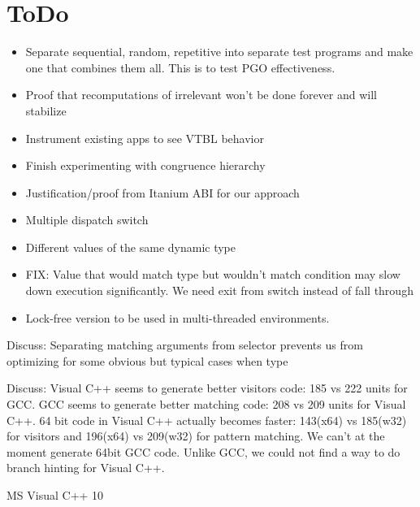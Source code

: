 \documentclass[submission,copyright]{eptcs}
\begin{document}
\section{ToDo} %
\begin{itemize}
\item Separate sequential, random, repetitive into separate test programs
      and make one that combines them all. This is to test PGO effectiveness.
\item Proof that recomputations of irrelevant won't be done forever and will 
      stabilize
\item Instrument existing apps to see VTBL behavior
\item Finish experimenting with congruence hierarchy
\item Justification/proof from Itanium ABI for our approach
\item Multiple dispatch switch
\item Different values of the same dynamic type
\item FIX: Value that would match type but wouldn't match condition may slow 
      down execution significantly. We need exit from switch instead of fall 
      through
\item Lock-free version to be used in multi-threaded environments.
\end{itemize}

Discuss: Separating matching arguments from selector prevents us from optimizing
for some obvious but typical cases when type 

Discuss:
Visual C++ seems to generate better visitors code: 185 vs 222 units for GCC.
GCC seems to generate better matching code: 208 vs 209 units for Visual C++.
64 bit code in Visual C++ actually becomes faster: 143(x64) vs 185(w32) for 
visitors and 196(x64) vs 209(w32) for pattern matching. We can't at the moment 
generate 64bit GCC code.
Unlike GCC, we could not find a way to do branch hinting for Visual C++.

MS Visual C++ 10
\end{document}
